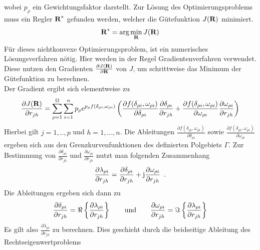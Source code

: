 wobei $p_\rho$ ein Gewichtungsfaktor darstellt.
Zur Lösung des Optimierungsproblems muss ein Regler $\textbf{R}^*$ gefunden werden, welcher die Gütefunktion $J(\textbf{R})$ minimiert.
\begin{equation}
	\textbf{R}^* = \textnormal{arg} \min_{\textbf{R}} J(\textbf{R})
\end{equation}
Für dieses nichtkonvexe Optimierungsproblem, ist ein numerisches Lösungsverfahren nötig.
Hier werden in der Regel Gradientenverfahren verwendet. Diese nutzen den Gradienten $\frac{\partial J(\textbf{R})}{\partial \textbf{R}}$ von $J$, um schrittweise das Minimum der Gütefunktion zu berechnen.\\
Der Gradient ergibt sich elementweise zu
\begin{equation}
	\frac{\partial J(\textbf{R})}{\partial r_{jh}} = \sum_{\rho = 1}^{\Omega} \sum_{i=1}^{n}
	p_\rho \mathrm{e}^{p_\rho f\left(\delta_{\rho i} ,\omega_{\rho i}\right)}
	\left(
	\frac{\partial f(\delta_{\rho i} ,\omega_{\rho i})}{\partial \delta_{\rho i}}
	\frac{\partial \delta_{\rho i} }{\partial r_{jh}} +
	\frac{\partial f(\delta_{\rho i} ,\omega_{\rho i})}{\partial \omega_{\rho i}}
	\frac{\partial \omega_{\rho i}}{\partial r_{jh}}
	\right)
\end{equation}
Hierbei gilt $j = 1,..,p$ und $h = 1,...,n$. Die Ableitungen $\frac{\partial f(\delta_{\rho i} ,\omega_{\rho i})}{\partial \delta_{\rho i}}$ sowie $	\frac{\partial f(\delta_{\rho i} ,\omega_{\rho i})}{\partial \omega_{\rho i}}$ ergeben sich aus den Grenzkurvenfunktionen des definierten Polgebiets $\Gamma$.
Zur Bestimmung von $\frac{\partial \delta_{\rho i} }{\partial r_{jh}} $ und $\frac{\partial \omega_{\rho i}}{\partial r_{jh}}$ nutzt man folgenden Zusammenhang
\begin{equation}
	\frac{\partial \lambda_{\rho i} }{\partial r_{jh}} = 	
	\frac{\partial \delta_{\rho i} }{\partial r_{jh}} +
	\textnormal{j}\frac{\partial \omega_{\rho i}}{\partial r_{jh}}
	\, \, \, .
\end{equation}
Die Ableitungen ergeben sich dann zu 
\begin{equation}
		\frac{\partial \delta_{\rho i} }{\partial r_{jh}} = \Re\left\{ \frac{\partial \lambda_{\rho i} }{\partial r_{jh}}  \right\}
		\qquad \textnormal{und} \qquad
		\frac{\partial \omega_{\rho i}}{\partial r_{jh}} = \Im\left\{ \frac{\partial \lambda_{\rho i} }{\partial r_{jh}} \right\}
\end{equation}
Es gilt also $\frac{\partial \lambda_{\rho i} }{\partial r_{jh}}$ zu berechnen. Dies geschieht durch die beidseitige Ableitung des Rechtseigenwertproblems 
